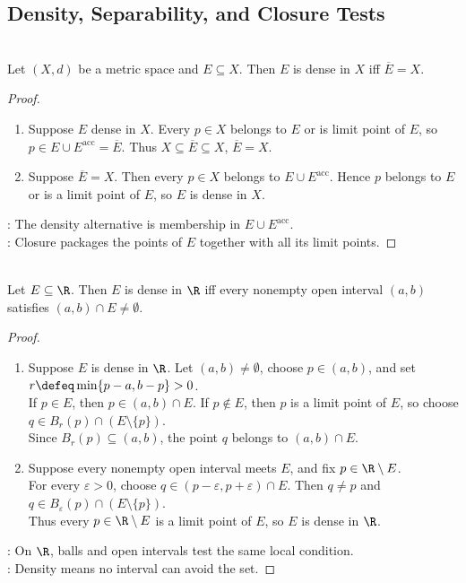 \subsection{Density, Separability, and Closure Tests}

\begin{proposition} \label{prop:dense-closure-criterion} \\
Let $(X,d)$ be a metric space and $E\subseteq X$. Then $E$ is dense in $X$ iff $\overline{E}=X$.
\begin{proof}
\begin{enumerate}[label=\roman*.]
\setlength{\itemsep}{0pt}
\item[$(\Rightarrow)$] Suppose $E$ dense in $X$. Every $p\in X$ belongs to $E$ or is limit point of $E$, so $p\in E\cup E^{\operatorname{acc}}=\overline{E}$. Thus $X\subseteq\overline{E}\subseteq X$, $\overline{E}=X$.
\item[$(\Leftarrow)$] Suppose $\overline{E}=X$. Then every $p\in X$ belongs to $E\cup E^{\operatorname{acc}}$. Hence $p$ belongs to $E$ or is a limit point of $E$, so $E$ is dense in $X$.
\end{enumerate}
: The density alternative is membership in $E\cup E^{\operatorname{acc}}$.\\
: Closure packages the points of $E$ together with all its limit points.
\end{proof}
\end{proposition}

\begin{proposition} \label{prop:dense-closure-and-interval-test} \\
Let $E\subseteq\R$. Then $E$ is dense in $\R$ iff every nonempty open interval $(a,b)$ satisfies $(a,b)\cap E\neq\emptyset$.
\begin{proof}
\begin{enumerate}[label=\roman*.]
\setlength{\itemsep}{0pt}
\item[$(\Rightarrow)$] Suppose $E$ is dense in $\R$. Let $(a,b)\neq\emptyset$, choose $p\in(a,b)$, and set $r\defeq\min\{p-a,b-p\}>0$.\\
If $p\in E$, then $p\in(a,b)\cap E$. If $p\notin E$, then $p$ is a limit point of $E$, so choose $q\in B_r(p)\cap(E\setminus\{p\})$.\\
Since $B_r(p)\subseteq(a,b)$, the point $q$ belongs to $(a,b)\cap E$.
\item[$(\Leftarrow)$] Suppose every nonempty open interval meets $E$, and fix $p\in\R\setminus E$.\\
For every $\varepsilon>0$, choose $q\in(p-\varepsilon,p+\varepsilon)\cap E$. Then $q\neq p$ and $q\in B_\varepsilon(p)\cap(E\setminus\{p\})$.\\
Thus every $p\in\R\setminus E$ is a limit point of $E$, so $E$ is dense in $\R$.
\end{enumerate}
: On $\R$, balls and open intervals test the same local condition.\\
: Density means no interval can avoid the set.
\end{proof}
\end{proposition}

